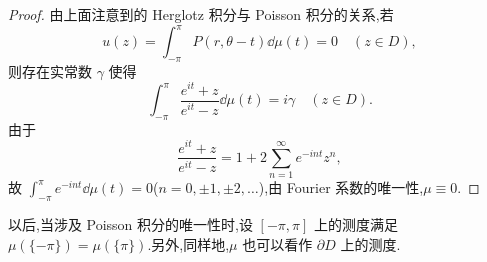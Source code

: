 \begin{proof}
由上面注意到的 Herglotz 积分与 Poisson 积分的关系,若
\begin{equation*}
u(z) = \int_{-\pi}^{\pi}P(r, \theta - t)\dd\mu(t) = 0 \quad (z \in D),
\end{equation*}
则存在实常数 $\gamma$ 使得
\begin{equation*}
\int_{-\pi}^{\pi}\frac{e^{it} + z}{e^{it} - z}\dd\mu(t) = i\gamma \quad (z \in D).
\end{equation*}
由于
\begin{equation*}
\frac{e^{it} + z}{e^{it} - z} = 1 + 2\sum_{n = 1}^{\infty}e^{-int}z^{n},
\end{equation*}
故 $\int_{-\pi}^{\pi}e^{-int}\dd\mu(t) = 0$($n = 0, \pm 1, \pm 2, \ldots$),由 Fourier 系数的唯一性,$\mu \equiv 0$.
\end{proof}

以后,当涉及 Poisson 积分的唯一性时,设 $[-\pi, \pi]$ 上的测度满足 $\mu(\{-\pi\}) = \mu(\{\pi\})$.另外,同样地,$\mu$ 也可以看作 $\partial D$ 上的测度.
